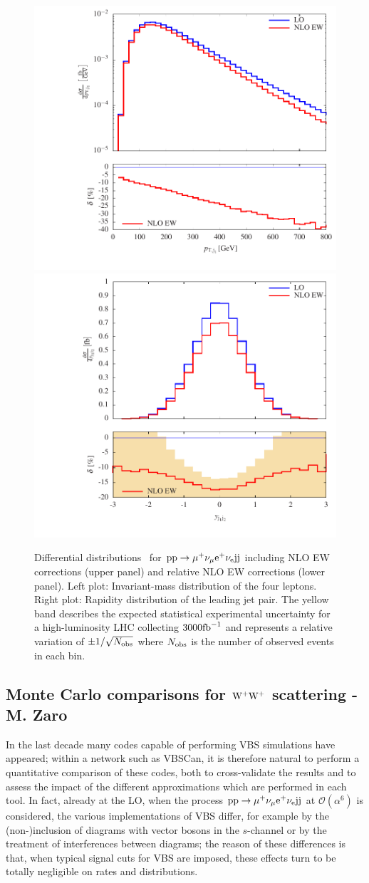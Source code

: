 \begin{figure}
\includegraphics[width=.47\textwidth]{WG1_plots/histogram_transverse_momentum_j1_ew}
\includegraphics[width=.47\textwidth]{WG1_plots/histogram_rapidity_j1j2_ew}
\caption{Differential distributions~\cite{Biedermann:2016yds} for ${\rm p}{\rm p}\to\mu^+\nu_\mu{\rm e}^+\nu_{\rm e}{\rm j}{\rm j}$ including NLO EW corrections (upper panel) and relative NLO EW corrections (lower panel).
Left plot: Invariant-mass distribution of the four leptons.
Right plot: Rapidity distribution of the leading jet pair.
The yellow band describes the expected statistical experimental uncertainty for a high-luminosity LHC collecting $3000{\rm fb}^{-1}$ and represents a relative variation of $\pm 1/\sqrt{N_{\rm obs}}$ where $N_{\rm obs}$ is the number of observed events in each bin.}
\label{fig:VBSEW}
\end{figure}

\subsection{Monte Carlo comparisons for ${\rm W^+ W^+}$ scattering - M. Zaro}
In the last decade many codes capable of performing VBS simulations have appeared; within a network such as VBSCan, it is therefore natural to perform 
a quantitative comparison of these codes, both to cross-validate the results and to assess the impact of the different approximations which are performed in each tool. In fact, 
already at the LO, when the process ${\rm p}{\rm p}\to\mu^+\nu_\mu{\rm e}^+\nu_{\rm e}{\rm j}{\rm j}$ at $\mathcal O (\alpha^6)$ is considered, the various implementations of VBS differ, for example
by the (non-)inclusion of diagrams with vector bosons in the $s$-channel or by the treatment of interferences between diagrams; the reason of these differences is that, 
when typical signal cuts for VBS are imposed, these effects turn to be totally negligible on rates and distributions.

